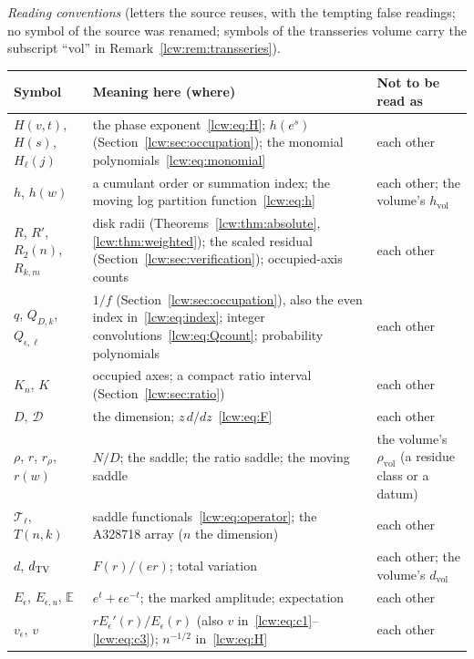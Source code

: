 \documentclass[11pt,letterpaper]{article}
\theoremstyle{remark}\newtheorem{remark}[theorem]{Remark}
\newcommand{\E}{\mathbb E}\newcommand{\Pp}{\mathbb P}
\begin{document}
\medskip\noindent\begin{minipage}{\textwidth}
\emph{Reading conventions} (letters the source reuses, with the tempting
false readings; no symbol of the source was renamed; symbols of the
transseries volume carry the subscript ``vol'' in
Remark~\ref{lcw:rem:transseries}).\par
\smallskip
\begingroup\small\renewcommand{\arraystretch}{1.1}
\noindent\begin{tabular}{@{}>{\raggedright\arraybackslash}p{0.95in}>{\raggedright\arraybackslash}p{3.45in}>{\raggedright\arraybackslash}p{1.75in}@{}}
\toprule
Symbol & Meaning here (where) & Not to be read as\\
\midrule
$H(v,t)$, $H(s)$, $H_\ell(j)$ & the phase exponent~\eqref{lcw:eq:H}; $h(e^s)$ (Section~\ref{lcw:sec:occupation}); the monomial polynomials~\eqref{lcw:eq:monomial} & each other\\
$h$, $h(w)$ & a cumulant order or summation index; the moving log partition function~\eqref{lcw:eq:h} & each other; the volume's $h_{\mathrm{vol}}$\\
$R$, $R'$, $R_2(n)$, $R_{k,m}$ & disk radii (Theorems~\ref{lcw:thm:absolute}, \ref{lcw:thm:weighted}); the scaled residual (Section~\ref{lcw:sec:verification}); occupied-axis counts & each other\\
$q$, $Q_{D,k}$, $Q_{\epsilon,\ell}$ & $1/f$ (Section~\ref{lcw:sec:occupation}), also the even index in~\eqref{lcw:eq:index}; integer convolutions~\eqref{lcw:eq:Qcount}; probability polynomials & each other\\
$K_n$, $K$ & occupied axes; a compact ratio interval (Section~\ref{lcw:sec:ratio}) & each other\\
$D$, $\mathcal D$ & the dimension; $z\,d/dz$~\eqref{lcw:eq:F} & each other\\
$\rho$, $r$, $r_\rho$, $r(w)$ & $N/D$; the saddle; the ratio saddle; the moving saddle & the volume's $\rho_{\mathrm{vol}}$ (a residue class or a datum)\\
$\mathcal T_\ell$, $T(n,k)$ & saddle functionals~\eqref{lcw:eq:operator}; the A328718 array ($n$ the dimension) & each other\\
$d$, $d_{\rm TV}$ & $F(r)/(er)$; total variation & each other; the volume's $d_{\mathrm{vol}}$\\
$E_\epsilon$, $E_{\epsilon,u}$, $\E$ & $e^t+\epsilon e^{-t}$; the marked amplitude; expectation & each other\\
$v_\epsilon$, $v$ & $rE_\epsilon'(r)/E_\epsilon(r)$ (also $v$ in~\eqref{lcw:eq:c1}--\eqref{lcw:eq:c3}); $n^{-1/2}$ in~\eqref{lcw:eq:H} & each other\\

\end{tabular}
\end{minipage}
\end{document}
